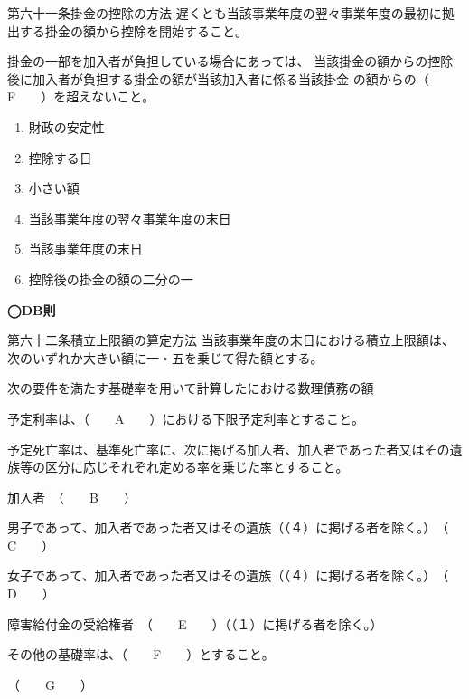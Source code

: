 \begin{fillblank}[数理人試験 2024 問題1 設問1 A〜F]
\begin{lawstructure}
\begin{lawarticle}{第六十一条}{掛金の控除の方法}
      遅くとも当該事業年度の翌々事業年度の最初に拠出する掛金の額から控除を開始すること。

      掛金の一部を加入者が負担している場合にあっては、
      当該掛金の額からの控除後に加入者が負担する掛金の額が当該加入者に係る当該掛金
      の額からの（　　F　　）を超えないこと。
    \end{lawarticle}
  \end{lawstructure}
  
\end{fillblank}

\begin{answerbox}
  \begin{enumerate}[A: ]
    \item 財政の安定性
    \item 控除する日
    \item 小さい額
    \item 当該事業年度の翌々事業年度の末日
    \item 当該事業年度の末日
    \item 控除後の掛金の額の二分の一
  \end{enumerate}
\end{answerbox}



\begin{fillblank}
    \noindent \textbf{◯DB則}
  \begin{lawstructure}
    \begin{lawarticle}{第六十二条}{積立上限額の算定方法}
      当該事業年度の末日における積立上限額は、次のいずれか大きい額に一・五を乗じて得た額とする。

      次の要件を満たす基礎率を用いて計算したにおける数理債務の額

      予定利率は、（　　A　　）における下限予定利率とすること。

      予定死亡率は、基準死亡率に、次に掲げる加入者、加入者であった者又はその遺族等の区分に応じそれぞれ定める率を乗じた率とすること。

      加入者　（　　B　　）

      男子であって、加入者であった者又はその遺族（（４）に掲げる者を除く。）　（　　C　　）

      女子であって、加入者であった者又はその遺族（（４）に掲げる者を除く。）　（　　D　　）

      障害給付金の受給権者　（　　E　　）（（１）に掲げる者を除く。）

      その他の基礎率は、（　　F　　）とすること。

      （　　G　　）
    \end{lawarticle}
  \end{lawstructure}
\end{fillblank}

